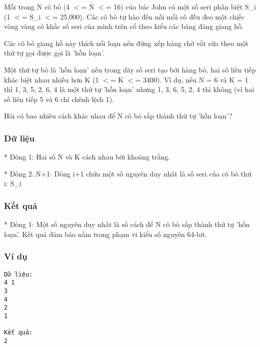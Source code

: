 



   Mỗi trong N cô bò (4 $<$= N $<$= 16) của bác John có một số seri phân biệt S\_i (1 $<$= S\_i $<$= 25,000). Các cô bò tự hào đến nỗi mỗi cô đều đeo một chiếc vòng vàng có khắc số seri của mình trên cổ theo kiểu các băng đảng giang hồ.  

   Các cô bò giang hồ này thích nổi loạn nên đứng xếp hàng chờ vắt sữa theo một thứ tự gọi được gọi là 'hỗn loạn'.  

   Một thứ tự bò là 'hỗn loạn' nếu trong dãy số seri tạo bởi hàng bò, hai số liên tiếp khác biệt nhau nhiều hơn K (1 $<$= K $<$= 3400). Ví dụ, nếu N = 6 và K = 1 thì 1, 3, 5, 2, 6, 4 là một thứ tự 'hỗn loạn' nhưng 1, 3, 6, 5, 2, 4 thì không (vì hai số liên tiếp 5 và 6 chỉ chênh lệch 1).  

   Hỏi có bao nhiêu cách khác nhau để N cô bò sắp thành thứ tự 'hỗn loạn'?  

\subsubsection{   Dữ liệu  }

   * Dòng 1: Hai số N và K cách nhau bởi khoảng trắng.  

   * Dòng 2..N+1: Dòng i+1 chứa một số nguyên duy nhất là số seri của cô bò thứ i: S\_i  

\subsubsection{   Kết quả  }

   * Dòng 1: Một số nguyên duy nhất là số cách để N cô bò sắp thành thứ tự 'hỗn loạn'. Kết quả đảm bảo nằm trong phạm vi kiểu số nguyên 64-bit.  

\subsubsection{   Ví dụ  }
\begin{verbatim}
Dữ liệu:
4 1
3
4
2
1

Kết quả:
2
\end{verbatim}